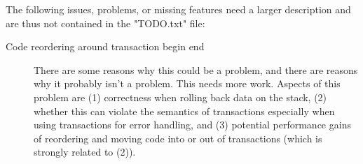 The following issues, problems, or missing features need a larger description
and are thus not contained in the "TODO.txt" file:
\begin{description}
 \item[Code reordering around transaction begin end] There are some reasons
why this could be a problem, and there are reasons why it probably isn't a
problem. This needs more work. Aspects of this problem are (1)
correctness when rolling back data on the stack, (2) whether this can violate
the semantics of transactions especially when using transactions for error
handling, and (3) potential performance gains of reordering and moving
code into or out of transactions (which is strongly related to (2)).
\end{description}
